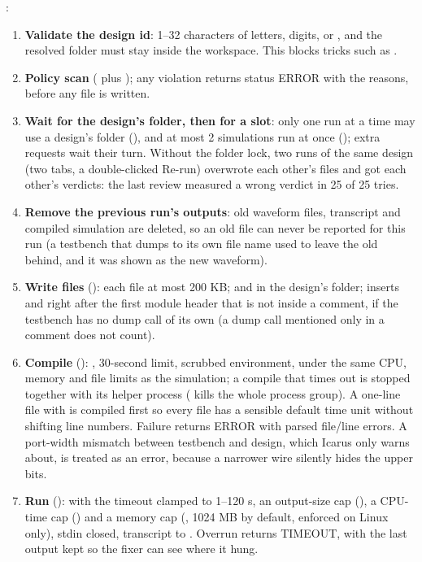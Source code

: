 :

\begin{enumerate}
  \item \textbf{Validate the design id}: 1--32 characters of letters, digits, \code{_} or \code{-}, and the resolved folder must stay inside the workspace. This blocks tricks such as .
  \item \textbf{Policy scan} ( plus ); any violation returns status ERROR with the reasons, before any file is written.
  \item \textbf{Wait for the design's folder, then for a slot}: only one run at a time may use a design's folder (), and at most 2 simulations run at once (); extra requests wait their turn. Without the folder lock, two runs of the same design (two tabs, a double-clicked Re-run) overwrote each other's files and got each other's verdicts: the last review measured a wrong verdict in 25 of 25 tries.
  \item \textbf{Remove the previous run's outputs}: old waveform files, transcript and compiled simulation are deleted, so an old file can never be reported for this run (a testbench that dumps to its own file name used to leave the old  behind, and it was shown as the new waveform).
  \item \textbf{Write files} (): each file at most 200 KB;  and  in the design's folder;  inserts  and  right after the first module header that is not inside a comment, if the testbench has no dump call of its own (a dump call mentioned only in a comment does not count).
  \item \textbf{Compile} (): , 30-second limit, scrubbed environment, under the same CPU, memory and file limits as the simulation; a compile that times out is stopped together with its helper process  ( kills the whole process group). A one-line file with  is compiled first so every file has a sensible default time unit without shifting line numbers. Failure returns ERROR with parsed file/line errors. A port-width mismatch between testbench and design, which Icarus only warns about, is treated as an error, because a narrower wire silently hides the upper bits.
  \item \textbf{Run} ():  with the timeout clamped to 1--120 s, an output-size cap (), a CPU-time cap () and a memory cap (, 1024 MB by default, enforced on Linux only), stdin closed, transcript to . Overrun returns TIMEOUT, with the last output kept so the fixer can see where it hung.

\end{enumerate}
